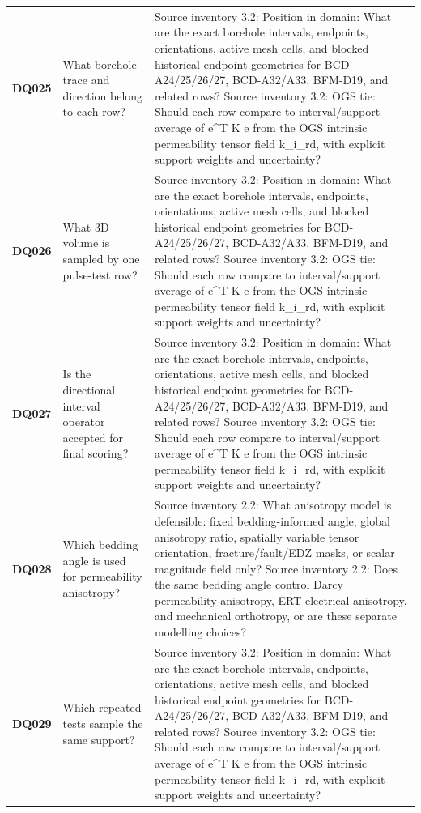 \begin{longtable}{@{}L{0.09\textwidth} L{0.31\textwidth} L{0.52\textwidth}@{}}
\addlinespace[0.18em]
\textbf{DQ025} & What borehole trace and direction belong to each row? & Source inventory 3.2: Position in domain: What are the exact borehole intervals, endpoints, orientations, active mesh cells, and blocked historical endpoint geometries for BCD-A24/25/26/27, BCD-A32/A33, BFM-D19, and related rows? Source inventory 3.2: OGS tie: Should each row compare to interval/support average of e\textasciicircum{}T K e from the OGS intrinsic permeability tensor field k\_i\_rd, with explicit support weights and uncertainty?\\
\addlinespace[0.18em]
\textbf{DQ026} & What 3D volume is sampled by one pulse-test row? & Source inventory 3.2: Position in domain: What are the exact borehole intervals, endpoints, orientations, active mesh cells, and blocked historical endpoint geometries for BCD-A24/25/26/27, BCD-A32/A33, BFM-D19, and related rows? Source inventory 3.2: OGS tie: Should each row compare to interval/support average of e\textasciicircum{}T K e from the OGS intrinsic permeability tensor field k\_i\_rd, with explicit support weights and uncertainty?\\
\addlinespace[0.18em]
\textbf{DQ027} & Is the directional interval operator accepted for final scoring? & Source inventory 3.2: Position in domain: What are the exact borehole intervals, endpoints, orientations, active mesh cells, and blocked historical endpoint geometries for BCD-A24/25/26/27, BCD-A32/A33, BFM-D19, and related rows? Source inventory 3.2: OGS tie: Should each row compare to interval/support average of e\textasciicircum{}T K e from the OGS intrinsic permeability tensor field k\_i\_rd, with explicit support weights and uncertainty?\\
\addlinespace[0.18em]
\textbf{DQ028} & Which bedding angle is used for permeability anisotropy? & Source inventory 2.2: What anisotropy model is defensible: fixed bedding-informed angle, global anisotropy ratio, spatially variable tensor orientation, fracture/fault/EDZ masks, or scalar magnitude field only? Source inventory 2.2: Does the same bedding angle control Darcy permeability anisotropy, ERT electrical anisotropy, and mechanical orthotropy, or are these separate modelling choices?\\
\addlinespace[0.18em]
\textbf{DQ029} & Which repeated tests sample the same support? & Source inventory 3.2: Position in domain: What are the exact borehole intervals, endpoints, orientations, active mesh cells, and blocked historical endpoint geometries for BCD-A24/25/26/27, BCD-A32/A33, BFM-D19, and related rows? Source inventory 3.2: OGS tie: Should each row compare to interval/support average of e\textasciicircum{}T K e from the OGS intrinsic permeability tensor field k\_i\_rd, with explicit support weights and uncertainty?\\

\end{longtable}
